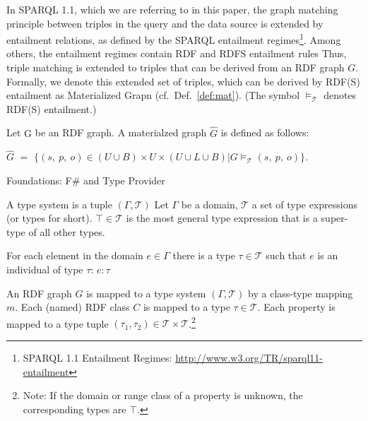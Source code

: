 \documentclass{llncs} %
\newcommand{\fs}{\textsf{F\#}\xspace}
\begin{document}
In SPARQL 1.1, which we are referring to in this paper, the graph matching principle between triples in the query and the data source
is extended by entailment relations, as defined by the SPARQL entailment regimes\footnote{SPARQL 1.1 Entailment Regimes:
\url{http://www.w3.org/TR/sparql11-entailment}}. Among others, the entailment regimes contain RDF and RDFS entailment rules
Thus, triple matching is extended to triples that can be derived from an RDF graph $G$. Formally, we denote
this extended set of triples, which can be derived by RDF(S) entailment as Materialized Grapn (cf.~Def.~\ref{def:mat}).
(The symbol $\models_{\mathcal{T}}$ denotes RDF(S) entailment.)

\begin{definition}
\label{def:rdf}
Let $\mathrm{G}$ be an RDF graph. A materialzed graph $\hat{G}$ is defined as follows:

$\hat{G}$ $=$ $\{ (s ,\ p , \ o) \in (U\cup B)\times U \times (U\cup L \cup B)  | G \models_{\mathcal{T}} (s, \ p, \ o) \}  $. 
\end{definition}



Foundations: \fs and Type Provider

\begin{definition}
\label{def:type}
A type system is a tuple $(\Gamma, \mathcal{T})$
Let $\Gamma$ be a domain,  $\mathcal{T}$ a set of type expressions (or types for short).
$\top \in \mathcal{T}$ is the most general type expression that is a super-type of all other types.

For each element in the domain $e \in \Gamma$ there is a type $\tau \in \mathcal{T}$ such
that $e$ is an individual of type $\tau$: $e: \tau$
\end{definition}


\begin{definition}
\label{def:map}
An RDF graph $G$ is mapped to a type system $(\Gamma, \mathcal{T})$ by a class-type mapping $m$.
Each (named) RDF class $C$ is mapped to a type $\tau \in \mathcal{T}$. Each
property is mapped to a type tuple $(\tau_1, \tau_2) \in \mathcal{T} \times \mathcal{T}$.\footnote{Note: If
the domain or range class of a property is unknown, the corresponding types are $\top$.}
\end{definition}
\end{document}
